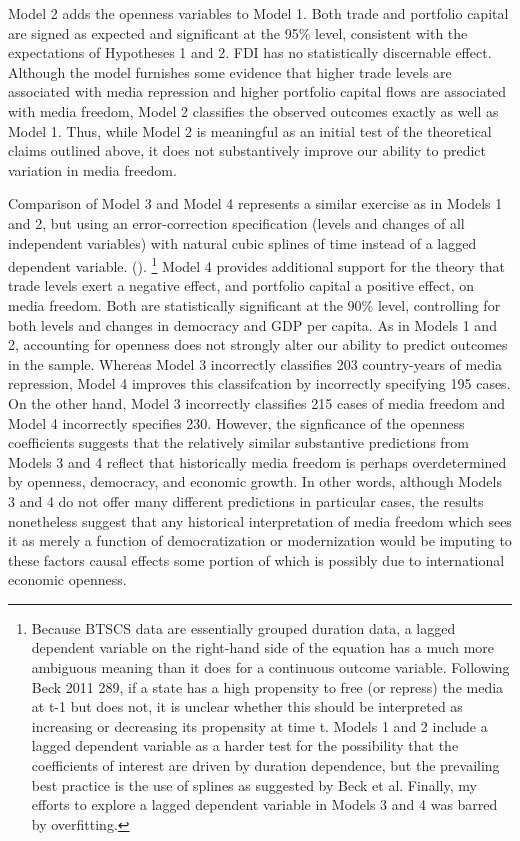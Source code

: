\documentclass[12pt]{report}
\begin{document}
Model 2 adds the openness variables to Model 1. Both trade and portfolio
capital are signed as expected and significant at the 95\% level,
consistent with the expectations of Hypotheses 1 and 2. FDI has no
statistically discernable effect. Although the model furnishes some
evidence that higher trade levels are associated with media repression
and higher portfolio capital flows are associated with media freedom,
Model 2 classifies the observed outcomes exactly as well as Model
1. Thus, while Model 2 is meaningful as an initial test of the theoretical
claims outlined above, it does not substantively improve our ability
to predict variation in media freedom.

Comparison of Model 3 and Model 4 represents a similar exercise as
in Models 1 and 2, but using an error-correction specification (levels
and changes of all independent variables) with natural cubic splines
of time instead of a lagged dependent variable. (\citealt{Beck:1998wg}).%
\footnote{Because BTSCS data are essentially grouped duration data, a lagged
dependent variable on the right-hand side of the equation has a much
more ambiguous meaning than it does for a continuous outcome variable.
Following Beck 2011 289, if a state has a high propensity to free
(or repress) the media at t-1 but does not, it is unclear whether
this should be interpreted as increasing or decreasing its propensity
at time t. Models 1 and 2 include a lagged dependent variable as a
harder test for the possibility that the coefficients of interest
are driven by duration dependence, but the prevailing best practice
is the use of splines as suggested by Beck et al. Finally, my efforts
to explore a lagged dependent variable in Models 3 and 4 was barred
by overfitting.%
} Model 4 provides additional support for the theory that trade levels
exert a negative effect, and portfolio capital a positive effect,
on media freedom. Both are statistically significant at the 90\% level,
controlling for both levels and changes in democracy and GDP per capita.
As in Models 1 and 2, accounting for openness does not strongly alter
our ability to predict outcomes in the sample. Whereas Model 3 incorrectly
classifies 203 country-years of media repression, Model 4 improves
this classifcation by incorrectly specifying 195 cases. On the other
hand, Model 3 incorrectly classifies 215 cases of media freedom and
Model 4 incorrectly specifies 230. However, the signficance of the
openness coefficients suggests that the relatively similar substantive
predictions from Models 3 and 4 reflect that historically media freedom
is perhaps overdetermined by openness, democracy, and economic growth.
In other words, although Models 3 and 4 do not offer many different
predictions in particular cases, the results nonetheless suggest that
any historical interpretation of media freedom which sees it as merely
a function of democratization or modernization would be imputing to
these factors causal effects some portion of which is possibly due
to international economic openness.
\end{document}

